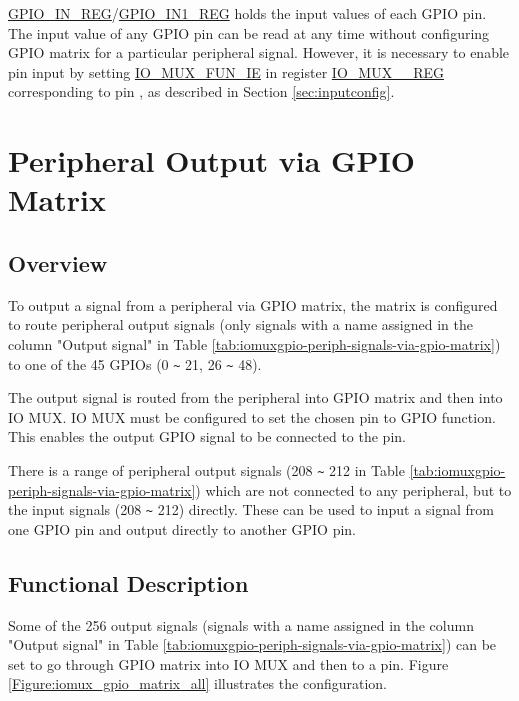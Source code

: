 \documentclass[main\_\_EN.tex]{subfiles}
\begin{document}
\hyperref[regdesc:GPIOINREG]{GPIO\_IN\_REG}/\hyperref[regdesc:GPIOIN1REG]{GPIO\_IN1\_REG} holds the input values of each GPIO pin. The input value of any GPIO pin can be read at any time without configuring GPIO matrix for a particular peripheral signal. However, it is necessary to enable pin input by setting \hyperref[fielddesc:IOMUXFUNIE]{IO\_MUX\_FUN\_IE} in register \hyperref[regdesc:IOMUXnREG]{IO\_MUX\_\_REG} corresponding to pin , as described in Section \ref{sec:inputconfig}.

\section{Peripheral Output via GPIO Matrix}

\subsection{Overview}

To output a signal from a peripheral via GPIO matrix, the matrix is configured to route peripheral output signals (only signals with a name assigned in the column "Output signal" in Table \ref{tab:iomuxgpio-periph-signals-via-gpio-matrix}) to one of the 45 GPIOs (0 \verb+~+ 21, 26 \verb+~+ 48).

The output signal is routed from the peripheral into GPIO matrix and then into IO MUX. IO MUX must be configured to set the chosen pin to GPIO function. This enables the output GPIO signal to be connected to the pin.

\begin{tiplisting}
There is a range of peripheral output signals (208 \verb+~+ 212 in Table \ref{tab:iomuxgpio-periph-signals-via-gpio-matrix}) which are not connected to any peripheral, but to the input signals (208 \verb+~+ 212) directly. These can be used to input a signal from one GPIO pin and output directly to another GPIO pin.
\end{tiplisting}


\vspace{-2em}
\subsection{Functional Description}\label{IOMUXPeripheralOutput}

Some of the 256 output signals (signals with a name assigned in the column "Output signal" in Table \ref{tab:iomuxgpio-periph-signals-via-gpio-matrix}) can be set to go through GPIO matrix into IO MUX and then to a pin. Figure \ref{Figure:iomux_gpio_matrix_all} illustrates the configuration.
\end{document}
